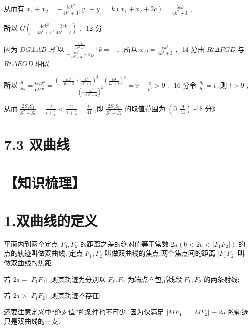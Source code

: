\documentclass[10pt]{article}
\begin{document}
从而有 \({x}_{1} + {x}_{2} =  - \frac{{8c}{k}^{2}}{4{k}^{2} + 3},{y}_{1} + {y}_{2} = k\left( {{x}_{1} + {x}_{2} + {2c}}\right)  = \frac{6ck}{4{k}^{2} + 3}\) ,

所以 \(G\left( {-\frac{{4c}{k}^{2}}{4{k}^{2} + 3},\frac{3ck}{4{k}^{2} + 3}}\right)\) , -12 分

因为 \({DG} \bot  {AB}\) ,所以 \(\frac{\frac{3ck}{4{k}^{2} + 3}}{-\frac{{4c}{k}^{2}}{4{k}^{2} + 3} - {x}_{D}} \cdot  k =  - 1\) ,所以 \({x}_{D} = \frac{c{k}^{2}}{4{k}^{2} + 3}\) , -14 分由 \({Rt\Delta FGD}\) 与 \({Rt\Delta EOD}\) 相似,

所以 \(\frac{{S}_{1}}{{S}_{2}} = \frac{G{D}^{2}}{O{D}^{2}} = \frac{{\left( -\frac{{4c}{k}^{2}}{4{k}^{2} + 3} + \frac{c{k}^{2}}{4{k}^{2} + 3}\right) }^{2} + {\left( \frac{3ck}{4{k}^{2} + 3}\right) }^{2}}{{\left( -\frac{c{k}^{2}}{4{k}^{2} + 3}\right) }^{2}} = 9 + \frac{9}{{k}^{2}} > 9\) , -16 分令 \(\frac{{S}_{1}}{{S}_{2}} = t\) ,则 \(t > 9\) ,

从而 \(\frac{2{S}_{1}{S}_{2}}{{S}_{1}^{2} + {S}_{1}^{2}} = \frac{2}{t + \frac{1}{t}} < \frac{2}{9 + \frac{1}{9}} = \frac{9}{41}\) ,即 \(\frac{2{S}_{1}{S}_{2}}{{S}_{1}^{2} + {S}_{1}^{2}}\) 的取值范围为 \(\left( {0,\frac{9}{41}}\right)\) -18 分》

\section*{7.3 双曲线}

\section*{【知识梳理】}

\section*{1.双曲线的定义}

平面内到两个定点 \({F}_{1},{F}_{2}\) 的距离之差的绝对值等于常数 \({2a}\left( {0 < {2a} < \left| {{F}_{1}{F}_{2}}\right| }\right)\) 的点的轨迹叫做双曲线. 定点 \({F}_{1},{F}_{2}\) 叫做双曲线的焦点,两个焦点间的距离 \(\left| {{F}_{1}{F}_{2}}\right|\) 叫做双曲线的焦距.

若 \({2a} = \left| {{F}_{1}{F}_{2}}\right|\) ,则其轨迹为分别以 \({F}_{1},{F}_{2}\) 为端点不包括线段 \({F}_{1},{F}_{2}\) 的两条射线;

若 \({2a} > \left| {{F}_{1}{F}_{2}}\right|\) ,则其轨迹不存在;

还要注意定义中“绝对值”的条件也不可少. 因为仅满足 \(\left| {M{F}_{1}}\right|  - \left| {M{F}_{2}}\right|  = {2a}\) 的轨迹只是双曲线的一支.
\end{document}

